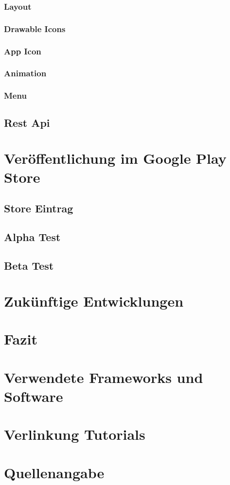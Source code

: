 \documentclass{scrartcl}
\begin{document}
\subsubsection{Layout}

\subsubsection{Drawable Icons}

\subsubsection{App Icon}

\subsubsection{Animation}

\subsubsection{Menu}


\subsection{Rest Api}

\newpage

\section{Veröffentlichung im Google Play Store}

\subsection{Store Eintrag}

\subsection{Alpha Test}

\subsection{Beta Test}

\newpage

\section{Zukünftige Entwicklungen}

\newpage

\section{Fazit}

\newpage

\section{Verwendete Frameworks und Software}

\newpage

\section{Verlinkung Tutorials}

\newpage

\section{Quellenangabe}
\end{document}
